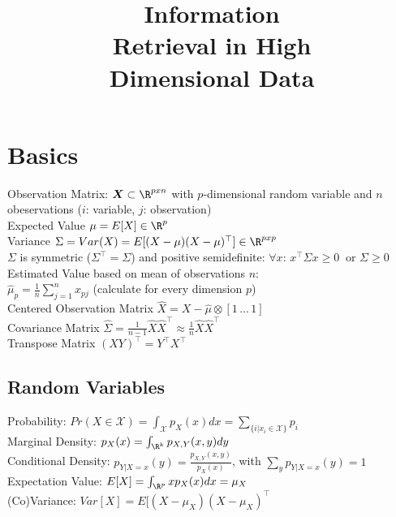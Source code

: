 \documentclass[english]{latex4ei/latex4ei_sheet}
\title{Information \\Retrieval in High\\ Dimensional Data}
\begin{document}
\maketitle	%

\section{Basics}
\begin{sectionbox}
Observation Matrix: $\boldsymbol{X} \subset \R^{pxn}$ with $p$-dimensional random variable and $n$ obeservations ($i$: variable, $j$: observation)\\
Expected Value $\mu=E[X]\in\R^p$ \\
Variance $\Sigma=Var(X)=E[(X-\mu)(X-\mu)^{\top}]\in\R^{pxp}$\\
$\Sigma$ is symmetric ($\Sigma^{\top} = \Sigma$) and positive semidefinite: $\forall x$: $x^{\top}\Sigma x \ge 0\ $ or $\Sigma \ge 0$\\
Estimated Value based on mean of observations $n$: \\ $\hat{\mu}_p=\frac{1}{n}\sum_{j=1}^nx_{pj}$ (calculate for every dimension $p$)\\
Centered Observation Matrix $\hat{X}=X-\hat{\mu}\otimes [1\,...\,1]$ \\
Covariance Matrix $\hat{\Sigma}=\frac{1}{n-1}\hat{X}\hat{X}^{\top}\approx \frac{1}{n}\hat{X}\hat{X}^{\top}$ \\
Transpose Matrix $(XY)^{\top}=Y^{\top}X^{\top}$\\
\subsection{Random Variables}
Probability: $Pr(X\in\mathcal{X})=\int_\mathcal{X}p_X(x)dx=\sum_{\{i|x_i\in\mathcal{X}\}}p_i$\\
Marginal Density: $p_X(x)=\int_{\R^k}p_{X,Y}(x,y)dy$\\
Conditional Density: $p_{Y|X=x}(y)=\frac{p_{X,Y}(x,y)}{p_X(x)}$, with $\sum_{y}p_{Y|X=x}(y)=1$ \\
Expectation Value: $E[X]=\int_{\R^p}xp_X(x)dx=\mu_X$\\
(Co)Variance: $Var[X]=E[(X-\mu_X)(X-\mu_X)^{\top}$
\end{sectionbox}
\end{document}
